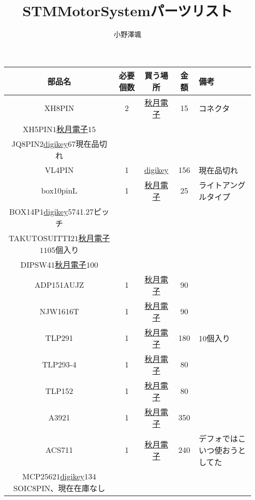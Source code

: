 \documentclass[12pt,a4paper,dvipdfmx]{jarticle}
\title{STMMotorSystemパーツリスト}
\author{小野澤颯}
\begin{document}
\maketitle
\begin{tabular}{ccccl}
	\hline
	部品名 &必要個数& 買う場所 & 金額 & 備考\\
	\hline
	XH8PIN &2& \href{hhttps://akizukidenshi.com/catalog/g/gC-12253/}{秋月電子} & 15 &コネクタ\\
	\hline
	XH5PIN$1$\href{https://akizukidenshi.com/catalog/g/gC-12250/}{秋月電子}$15$\\
	\hline
	JQ8PIN$2$\href{https://www.digikey.jp/product-detail/ja/jst-sales-america-inc/08JQ-BT/455-2970-ND/4918702}{digikey}$67$現在品切れ\\
	\hline
	VL4PIN&1&\href{https://www.digikey.jp/product-detail/ja/jst-sales-america-inc/B04P-VL-VN-1-8/455-3601-ND/2426345}{digikey}&156 &現在品切れ\\
	\hline
	box10pinL&1&\href{https://akizukidenshi.com/catalog/g/gC-13178/}{秋月電子}&25&ライトアングルタイプ\\
	\hline
	BOX14P$1$\href{https://www.digikey.jp/product-detail/ja/samtec-inc/FTSH-107-01-L-D-K/612-FTSH-107-01-L-D-K-ND/6693516}{digikey}$574$1.27ピッチ\\
	\hline
	TAKUTOSUITTI2$1$\href{https://akizukidenshi.com/catalog/g/gP-14888/}{秋月電子}$110$5個入り\\
	\hline
	DIPSW4$1$\href{https://akizukidenshi.com/catalog/g/gP-08929/}{秋月電子}$100$\\
	\hline
	ADP151AUJZ &1&\href{https://akizukidenshi.com/catalog/g/gI-14180/}{秋月電子}&90&\\
	\hline
	NJW1616T&1&\href{https://akizukidenshi.com/catalog/g/gI-15765/}{秋月電子}&90&\\
	\hline
	TLP291&1&\href{https://akizukidenshi.com/catalog/g/gI-16070/}{秋月電子}&180&10個入り\\
	\hline
	TLP293-4&1&\href{https://akizukidenshi.com/catalog/g/gI-16115/}{秋月電子}&80&\\
	\hline
	TLP152&1&\href{https://akizukidenshi.com/catalog/g/gI-10824/}{秋月電子}&80&\\
	\hline
	A3921&1&\href{https://akizukidenshi.com/catalog/g/gI-12293/}{秋月電子}&350&\\
	\hline
	ACS711&1&\href{https://akizukidenshi.com/catalog/g/gI-12267/}{秋月電子}&240&デフォではこいつ使おうとしてた\\
	\hline
	MCP2562$1$\href{https://www.digikey.jp/product-detail/ja/microchip-technology/MCP2562T-E-SN/MCP2562T-E-SNCT-ND/5011025}{digikey}$134$SOIC8PIN、現在在庫なし\\

\end{tabular}
\end{document}

